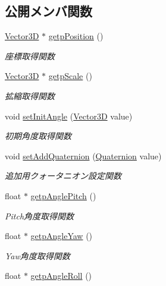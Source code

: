 \subsection*{公開メンバ関数}
\begin{DoxyCompactItemize}
\item 
\mbox{\hyperlink{class_vector3_d}{Vector3D}} $\ast$ \mbox{\hyperlink{class_transform_a1ed223415917a6b33e5fd7af132f6b9c}{getp\+Position}} ()
\begin{DoxyCompactList}\small\item\em 座標取得関数 \end{DoxyCompactList}\item 
\mbox{\hyperlink{class_vector3_d}{Vector3D}} $\ast$ \mbox{\hyperlink{class_transform_ac1a821bfab91b10a072eac81efdc741d}{getp\+Scale}} ()
\begin{DoxyCompactList}\small\item\em 拡縮取得関数 \end{DoxyCompactList}\item 
void \mbox{\hyperlink{class_transform_ab64af2387c413b75c26ef343104a56db}{set\+Init\+Angle}} (\mbox{\hyperlink{class_vector3_d}{Vector3D}} value)
\begin{DoxyCompactList}\small\item\em 初期角度取得関数 \end{DoxyCompactList}\item 
void \mbox{\hyperlink{class_transform_a0f7b2731c46624ea54126e36fe1d0dd1}{set\+Add\+Quaternion}} (\mbox{\hyperlink{_vector3_d_8h_a3ee38c9c46d9851e33a9a1113328dafc}{Quaternion}} value)
\begin{DoxyCompactList}\small\item\em 追加用クォータニオン設定関数 \end{DoxyCompactList}\item 
float $\ast$ \mbox{\hyperlink{class_transform_a85ecb6a9d972caf0ab7d2e58ad2753b7}{getp\+Angle\+Pitch}} ()
\begin{DoxyCompactList}\small\item\em Pitch角度取得関数 \end{DoxyCompactList}\item 
float $\ast$ \mbox{\hyperlink{class_transform_a69600cd68c0a99518efec7da592e4841}{getp\+Angle\+Yaw}} ()
\begin{DoxyCompactList}\small\item\em Yaw角度取得関数 \end{DoxyCompactList}\item 
float $\ast$ \mbox{\hyperlink{class_transform_aa1f056b8f90affed5e251e68a93331d4}{getp\+Angle\+Roll}} ()

\end{DoxyCompactItemize}
